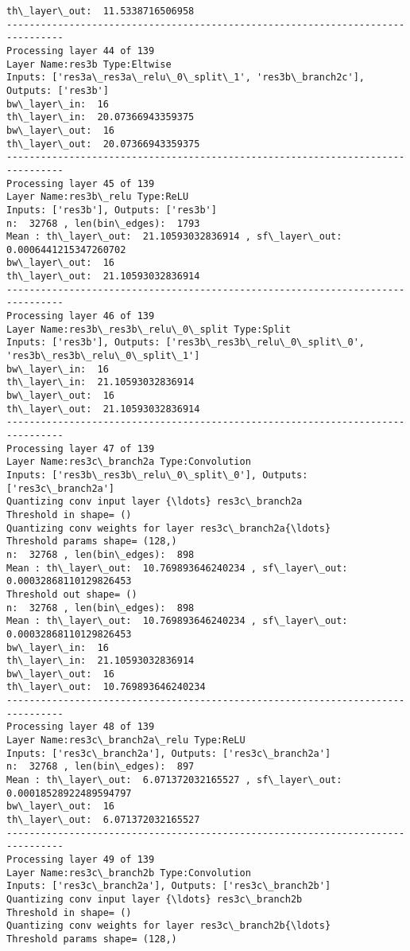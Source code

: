 \documentclass[11pt]{article}
\begin{document}
\begin{Verbatim}[commandchars=\\\{\}]
th\_layer\_out:  11.5338716506958
--------------------------------------------------------------------------------
Processing layer 44 of 139
Layer Name:res3b Type:Eltwise
Inputs: ['res3a\_res3a\_relu\_0\_split\_1', 'res3b\_branch2c'], Outputs: ['res3b']
bw\_layer\_in:  16
th\_layer\_in:  20.07366943359375
bw\_layer\_out:  16
th\_layer\_out:  20.07366943359375
--------------------------------------------------------------------------------
Processing layer 45 of 139
Layer Name:res3b\_relu Type:ReLU
Inputs: ['res3b'], Outputs: ['res3b']
n:  32768 , len(bin\_edges):  1793
Mean : th\_layer\_out:  21.10593032836914 , sf\_layer\_out:  0.0006441215347260702
bw\_layer\_out:  16
th\_layer\_out:  21.10593032836914
--------------------------------------------------------------------------------
Processing layer 46 of 139
Layer Name:res3b\_res3b\_relu\_0\_split Type:Split
Inputs: ['res3b'], Outputs: ['res3b\_res3b\_relu\_0\_split\_0', 'res3b\_res3b\_relu\_0\_split\_1']
bw\_layer\_in:  16
th\_layer\_in:  21.10593032836914
bw\_layer\_out:  16
th\_layer\_out:  21.10593032836914
--------------------------------------------------------------------------------
Processing layer 47 of 139
Layer Name:res3c\_branch2a Type:Convolution
Inputs: ['res3b\_res3b\_relu\_0\_split\_0'], Outputs: ['res3c\_branch2a']
Quantizing conv input layer {\ldots} res3c\_branch2a
Threshold in shape= ()
Quantizing conv weights for layer res3c\_branch2a{\ldots}
Threshold params shape= (128,)
n:  32768 , len(bin\_edges):  898
Mean : th\_layer\_out:  10.769893646240234 , sf\_layer\_out:  0.00032868110129826453
Threshold out shape= ()
n:  32768 , len(bin\_edges):  898
Mean : th\_layer\_out:  10.769893646240234 , sf\_layer\_out:  0.00032868110129826453
bw\_layer\_in:  16
th\_layer\_in:  21.10593032836914
bw\_layer\_out:  16
th\_layer\_out:  10.769893646240234
--------------------------------------------------------------------------------
Processing layer 48 of 139
Layer Name:res3c\_branch2a\_relu Type:ReLU
Inputs: ['res3c\_branch2a'], Outputs: ['res3c\_branch2a']
n:  32768 , len(bin\_edges):  897
Mean : th\_layer\_out:  6.071372032165527 , sf\_layer\_out:  0.00018528922489594797
bw\_layer\_out:  16
th\_layer\_out:  6.071372032165527
--------------------------------------------------------------------------------
Processing layer 49 of 139
Layer Name:res3c\_branch2b Type:Convolution
Inputs: ['res3c\_branch2a'], Outputs: ['res3c\_branch2b']
Quantizing conv input layer {\ldots} res3c\_branch2b
Threshold in shape= ()
Quantizing conv weights for layer res3c\_branch2b{\ldots}
Threshold params shape= (128,)

\end{Verbatim}
\end{document}
